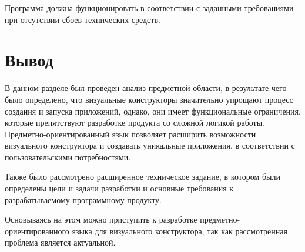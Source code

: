 Программа должна функционировать в соответствии с заданными требованиями при отсутствии сбоев технических средств.



\section*{Вывод}

В данном разделе был проведен анализ предметной области, в результате чего было определено,
что визуальные конструкторы значительно упрощают процесс создания и запуска приложений,
однако, они имеет функциональные ограничения, которые препятствуют разработке продукта со сложной логикой работы.
Предметно-ориентированный язык позволяет расширить возможности визуального конструктора и создавать уникальные приложения,
в соответствии с пользовательскими потребностями.

Также было рассмотрено расширенное техническое задание,
в котором были определены цели и задачи разработки и основные требования к разрабатываемому программному продукту.

Основываясь на этом можно приступить к разработке предметно-ориентированного языка для визуального конструктора,
так как рассмотренная проблема является актуальной.